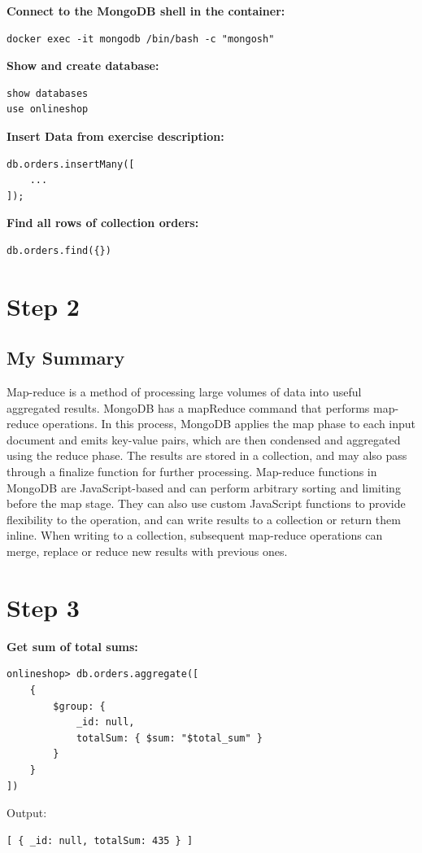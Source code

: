 \documentclass[14pt,a4paper]{extarticle}
\begin{document}
	\noindent \textbf{Connect to the MongoDB shell in the container:}
	\begin{lstlisting}[style=fish]
docker exec -it mongodb /bin/bash -c "mongosh"
	\end{lstlisting}

	\noindent \textbf{Show and create database:}
	\begin{lstlisting}[style=fish]
show databases
use onlineshop
	\end{lstlisting}

	\noindent \textbf{Insert Data from exercise description:}
	\begin{lstlisting}[style=fish]
db.orders.insertMany([
	...
]);
	\end{lstlisting}

	\noindent \textbf{Find all rows of collection orders:}
	\begin{lstlisting}[style=fish]
db.orders.find({})
	\end{lstlisting}

	\newpage
	\section*{Step 2}
	\subsection*{My Summary}
	Map-reduce is a method of processing large volumes of data into useful aggregated results.
	MongoDB has a mapReduce command that performs map-reduce operations.
	In this process, MongoDB applies the map phase to each input document and emits key-value pairs, which are then condensed and aggregated using the reduce phase.
	The results are stored in a collection, and may also pass through a finalize function for further processing.
	Map-reduce functions in MongoDB are JavaScript-based and can perform arbitrary sorting and limiting before the map stage.
	They can also use custom JavaScript functions to provide flexibility to the operation, and can write results to a collection or return them inline.
	When writing to a collection, subsequent map-reduce operations can merge, replace or reduce new results with previous ones.

	\newpage

	\section*{Step 3}

	\noindent \textbf{Get sum of total sums:}
	\begin{lstlisting}[style=fish]
onlineshop> db.orders.aggregate([
	{
		$group: {
			_id: null, 
			totalSum: { $sum: "$total_sum" } 
		}
	}  
])
	\end{lstlisting}
	\noindent Output:
	\begin{lstlisting}[style=fish]
[ { _id: null, totalSum: 435 } ]
	\end{lstlisting}
\end{document}
